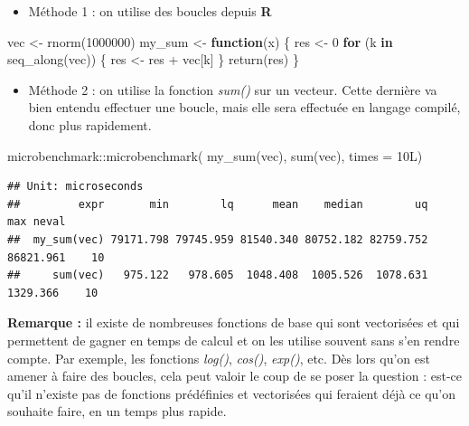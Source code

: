 \documentclass[
]{book}
\newenvironment{Shaded}{\begin{snugshade}}{\end{snugshade}}
\newcommand{\AttributeTok}[1]{\textcolor[rgb]{0.77,0.63,0.00}{#1}}
\newcommand{\ControlFlowTok}[1]{\textcolor[rgb]{0.13,0.29,0.53}{\textbf{#1}}}
\newcommand{\DecValTok}[1]{\textcolor[rgb]{0.00,0.00,0.81}{#1}}
\newcommand{\FunctionTok}[1]{\textcolor[rgb]{0.00,0.00,0.00}{#1}}
\newcommand{\NormalTok}[1]{#1}
\newcommand{\OtherTok}[1]{\textcolor[rgb]{0.56,0.35,0.01}{#1}}
\newcommand{\SpecialCharTok}[1]{\textcolor[rgb]{0.00,0.00,0.00}{#1}}
\providecommand{\tightlist}{%
  \setlength{\itemsep}{0pt}\setlength{\parskip}{0pt}}
\theoremstyle{definition}
\theoremstyle{definition}
\theoremstyle{definition}
\theoremstyle{definition}
\theoremstyle{remark}
\begin{document}
\begin{itemize}
\tightlist
\item
  Méthode 1 : on utilise des boucles depuis \textbf{R}
\end{itemize}

\begin{Shaded}
\begin{Highlighting}[]
\NormalTok{vec }\OtherTok{\textless{}{-}} \FunctionTok{rnorm}\NormalTok{(}\DecValTok{1000000}\NormalTok{)}
\NormalTok{my\_sum }\OtherTok{\textless{}{-}} \ControlFlowTok{function}\NormalTok{(x) \{}
\NormalTok{  res }\OtherTok{\textless{}{-}} \DecValTok{0}
  \ControlFlowTok{for}\NormalTok{ (k }\ControlFlowTok{in} \FunctionTok{seq\_along}\NormalTok{(vec)) \{}
\NormalTok{    res }\OtherTok{\textless{}{-}}\NormalTok{ res }\SpecialCharTok{+}\NormalTok{ vec[k] }
\NormalTok{  \} }
  \FunctionTok{return}\NormalTok{(res)}
\NormalTok{\}}
\end{Highlighting}
\end{Shaded}

\begin{itemize}
\tightlist
\item
  Méthode 2 : on utilise la fonction \emph{sum()} sur un vecteur. Cette dernière va bien entendu effectuer une boucle, mais elle sera effectuée en langage compilé, donc plus rapidement.
\end{itemize}

\begin{Shaded}
\begin{Highlighting}[]
\NormalTok{microbenchmark}\SpecialCharTok{::}\FunctionTok{microbenchmark}\NormalTok{(}
   \FunctionTok{my\_sum}\NormalTok{(vec), }
   \FunctionTok{sum}\NormalTok{(vec), }
   \AttributeTok{times =}\NormalTok{ 10L)}
\end{Highlighting}
\end{Shaded}

\begin{verbatim}
## Unit: microseconds
##         expr       min        lq      mean    median        uq       max neval
##  my_sum(vec) 79171.798 79745.959 81540.340 80752.182 82759.752 86821.961    10
##     sum(vec)   975.122   978.605  1048.408  1005.526  1078.631  1329.366    10
\end{verbatim}

\textbf{Remarque :} il existe de nombreuses fonctions de base qui sont vectorisées et qui permettent de gagner en temps de calcul et on les utilise souvent sans s'en rendre compte. Par exemple, les fonctions \emph{log()}, \emph{cos()}, \emph{exp()}, etc. Dès lors qu'on est amener à faire des boucles, cela peut valoir le coup de se poser la question : est-ce qu'il n'existe pas de fonctions prédéfinies et vectorisées qui feraient déjà ce qu'on souhaite faire, en un temps plus rapide.
\end{document}
